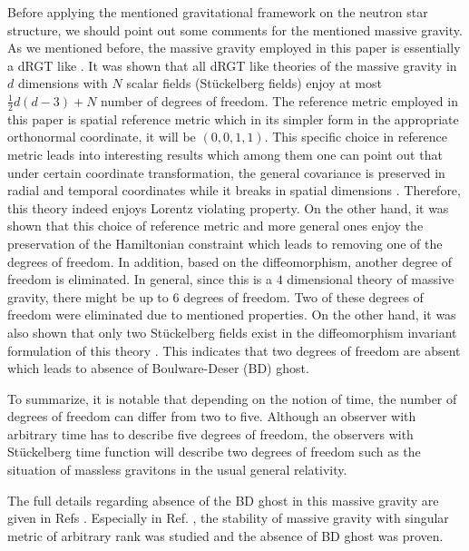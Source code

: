 \documentclass[aps]{revtex4}
\begin{document}
Before applying the mentioned gravitational framework on the
neutron star structure, we should point out some comments for the
mentioned massive gravity. As we mentioned before, the massive
gravity employed in this paper is essentially a dRGT like \cite
{review}. It was shown that all dRGT like theories of the massive
gravity in $d$ dimensions with $N$ scalar fields (St\"{u}ckelberg
fields) enjoy at most $\frac{1}{2}d\left( d-3\right) +N$ number of
degrees of freedom. The reference metric employed in this paper is
spatial reference metric which in its simpler form in the
appropriate orthonormal coordinate, it will be $( 0,0,1,1)$. This
specific choice in reference metric leads into interesting results
which among them one can point out that under certain coordinate
transformation, the general covariance is preserved in radial and
temporal coordinates while it breaks in spatial dimensions
\cite{Vegh}. Therefore, this theory indeed enjoys Lorentz
violating property. On the other hand, it was shown that this
choice of reference metric and more general ones enjoy the
preservation of the Hamiltonian constraint which leads to removing
one of the degrees of freedom. In addition, based on the
diffeomorphism, another degree of freedom is eliminated. In
general, since this is a $4$ dimensional theory of massive
gravity, there might be up to $6$ degrees of freedom. Two of these
degrees of freedom were eliminated due to mentioned properties. On
the other hand, it was also shown that only two St\"{u}ckelberg
fields exist in the diffeomorphism invariant formulation of this
theory \cite{Vegh}. This indicates that two degrees of freedom are
absent which leads to absence of Boulware-Deser (BD) ghost.

To summarize, it is notable that depending on the notion of time,
the number of degrees of freedom can differ from two to five.
Although an observer with arbitrary time has to describe five
degrees of freedom, the observers with St\"{u}ckelberg time
function will describe two degrees of freedom such as the
situation of massless gravitons in the usual general relativity.

The full details regarding absence of the BD ghost in this massive
gravity are given in Refs \cite{Vegh,Chin}. Especially in Ref.
\cite{Chin}, the stability of massive gravity with singular metric
of arbitrary rank was studied and the absence of BD ghost was
proven.
\end{document}

